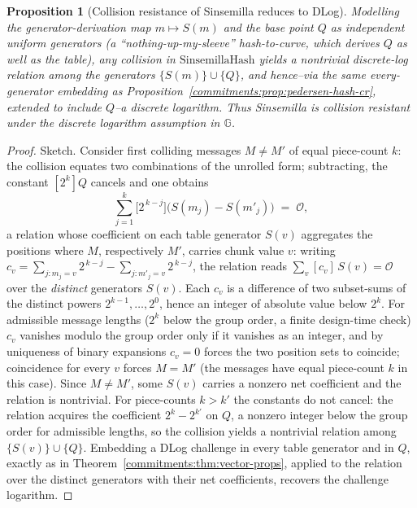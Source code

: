 \documentclass[11pt,a4paper]{article}
\newtheorem{proposition}[theorem]{Proposition}
\theoremstyle{definition}
\theoremstyle{remark}
\newcommand{\G}{\ensuremath{\mathbb{G}}}
\begin{document}
\begin{proposition}[Collision resistance of Sinsemilla reduces to DLog]\label{commitments:prop:sinsemilla-cr}
Modelling the generator-derivation map \(m \mapsto S(m)\) and the base point \(Q\) as independent uniform generators (a ``nothing-up-my-sleeve'' hash-to-curve, which derives \(Q\) as well as the table), any collision in \(\mathrm{SinsemillaHash}\) yields a nontrivial discrete-log relation among the generators \(\{S(m)\} \cup \{Q\}\), and hence--via the same every-generator embedding as Proposition~\ref{commitments:prop:pedersen-hash-cr}, extended to include \(Q\)--a discrete logarithm. Thus Sinsemilla is collision resistant under the discrete logarithm assumption in \(\G\).
\end{proposition}

\begin{proof}
Sketch. Consider first colliding messages \(M \neq M'\) of equal piece-count \(k\): the collision equates two combinations of the unrolled form; subtracting, the constant \([2^k]Q\) cancels and one obtains
\[
  \sum_{j=1}^{k} \bigl[2^{\,k-j}\bigr]\bigl( S(m_j) - S(m'_j) \bigr) \;=\; \mathcal{O},
\]
a relation whose coefficient on each table generator \(S(v)\) aggregates the positions where \(M\), respectively \(M'\), carries chunk value \(v\): writing \(c_v = \sum_{j \colon m_j = v} 2^{\,k-j} - \sum_{j \colon m'_j = v} 2^{\,k-j}\), the relation reads \(\sum_v [c_v]\, S(v) = \mathcal{O}\) over the \emph{distinct} generators \(S(v)\). Each \(c_v\) is a difference of two subset-sums of the distinct powers \(2^{k-1}, \dots, 2^{0}\), hence an integer of absolute value below \(2^k\). For admissible message lengths (\(2^k\) below the group order, a finite design-time check) \(c_v\) vanishes modulo the group order only if it vanishes as an integer, and by uniqueness of binary expansions \(c_v = 0\) forces the two position sets to coincide; coincidence for every \(v\) forces \(M = M'\) (the messages have equal piece-count \(k\) in this case). Since \(M \neq M'\), some \(S(v)\) carries a nonzero net coefficient and the relation is nontrivial. For piece-counts \(k > k'\) the constants do not cancel: the relation acquires the coefficient \(2^k - 2^{k'}\) on \(Q\), a nonzero integer below the group order for admissible lengths, so the collision yields a nontrivial relation among \(\{S(v)\} \cup \{Q\}\). Embedding a DLog challenge in every table generator and in \(Q\), exactly as in Theorem~\ref{commitments:thm:vector-props}, applied to the relation over the distinct generators with their net coefficients, recovers the challenge logarithm.
\end{proof}
\end{document}
